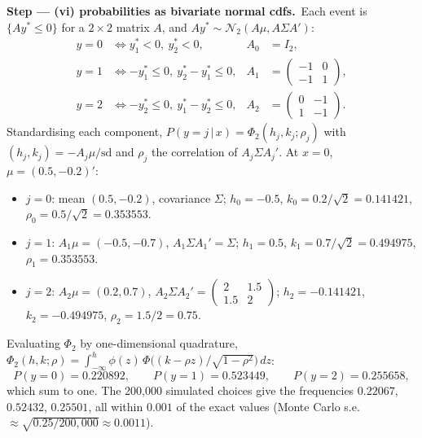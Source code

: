 \documentclass[11pt,a4paper]{article}
\numberwithin{equation}{questao}
\newcommand{\passo}[2]{\par\smallskip\noindent\textbf{Step --- #1.}~#2}
\newcommand{\N}{\mathcal{N}}
\begin{document}
\begin{sol}
\passo{(vi) probabilities as bivariate normal cdfs}{Each event is $\{Ay^*\le0\}$ for a $2\times2$ matrix $A$, and
$Ay^*\sim\N_2(A\mu,A\Sigma A')$:
\begin{align*}
y=0&\iff y_1^*<0,\ y_2^*<0, & A_0&=I_2,\\
y=1&\iff -y_1^*\le0,\ y_2^*-y_1^*\le0, & A_1&=\begin{pmatrix}-1&0\\-1&1\end{pmatrix},\\
y=2&\iff -y_2^*\le0,\ y_1^*-y_2^*\le0, & A_2&=\begin{pmatrix}0&-1\\1&-1\end{pmatrix}.
\end{align*}
Standardising each component, $P(y=j\,|\,x)=\Phi_2(h_j,k_j;\rho_j)$ with $(h_j,k_j)=-A_j\mu/\mathrm{sd}$ and $\rho_j$
the correlation of $A_j\Sigma A_j'$. At $x=0$, $\mu=(0.5,-0.2)'$:
\begin{itemize}[leftmargin=1.4em,topsep=1pt,itemsep=0pt]
\item $j=0$: mean $(0.5,-0.2)$, covariance $\Sigma$; $h_0=-0.5$, $k_0=0.2/\sqrt2=0.141421$, $\rho_0=0.5/\sqrt2=0.353553$.
\item $j=1$: $A_1\mu=(-0.5,-0.7)$, $A_1\Sigma A_1'=\Sigma$; $h_1=0.5$, $k_1=0.7/\sqrt2=0.494975$, $\rho_1=0.353553$.
\item $j=2$: $A_2\mu=(0.2,0.7)$, $A_2\Sigma A_2'=\begin{pmatrix}2&1.5\\1.5&2\end{pmatrix}$; $h_2=-0.141421$, $k_2=-0.494975$, $\rho_2=1.5/2=0.75$.
\end{itemize}
Evaluating $\Phi_2$ by one-dimensional quadrature, $\Phi_2(h,k;\rho)=\int_{-\infty}^{h}\phi(z)\,\Phi\big((k-\rho z)/\sqrt{1-\rho^2}\big)\,dz$:
\begin{equation*}
P(y=0)=0.220892,\qquad P(y=1)=0.523449,\qquad P(y=2)=0.255658,
\end{equation*}
which sum to one. The 200{,}000 simulated choices give the frequencies $0.22067$, $0.52432$, $0.25501$, all within
$0.001$ of the exact values (Monte Carlo s.e.\ $\approx\sqrt{0.25/200{,}000}\approx0.0011$).}


\end{sol}
\end{document}

